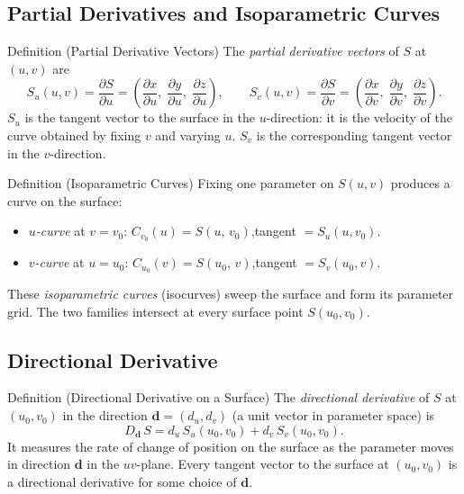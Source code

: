 \subsection*{Partial Derivatives and Isoparametric Curves}

\begin{propositionbox}{Definition (Partial Derivative Vectors)}
The \emph{partial derivative vectors} of $S$ at $(u,v)$ are
\[
  S_u(u,v) = \frac{\partial S}{\partial u}
  = \left(\frac{\partial x}{\partial u},\;
          \frac{\partial y}{\partial u},\;
          \frac{\partial z}{\partial u}\right),
  \qquad
  S_v(u,v) = \frac{\partial S}{\partial v}
  = \left(\frac{\partial x}{\partial v},\;
          \frac{\partial y}{\partial v},\;
          \frac{\partial z}{\partial v}\right).
\]
$S_u$ is the tangent vector to the surface in the $u$-direction:
it is the velocity of the curve obtained by fixing $v$ and varying $u$.
$S_v$ is the corresponding tangent vector in the $v$-direction.
\end{propositionbox}

\begin{propositionbox}{Definition (Isoparametric Curves)}
Fixing one parameter on $S(u,v)$ produces a curve on the surface:
\begin{itemize}
  \item \emph{$u$-curve} at $v = v_0$:\quad
        $C_{v_0}(u) = S(u,\,v_0)$,\quad tangent $= S_u(u,v_0)$.
  \item \emph{$v$-curve} at $u = u_0$:\quad
        $C_{u_0}(v) = S(u_0,\,v)$,\quad tangent $= S_v(u_0,v)$.
\end{itemize}
These \emph{isoparametric curves} (isocurves) sweep the surface and
form its parameter grid.
The two families intersect at every surface point $S(u_0,v_0)$.
\end{propositionbox}

\subsection*{Directional Derivative}

\begin{propositionbox}{Definition (Directional Derivative on a Surface)}
The \emph{directional derivative} of $S$ at $(u_0,v_0)$ in the
direction $\mathbf{d} = (d_u, d_v)$ (a unit vector in parameter space) is
\[
  D_{\mathbf{d}}\,S = d_u\,S_u(u_0,v_0) + d_v\,S_v(u_0,v_0).
\]
It measures the rate of change of position on the surface as the
parameter moves in direction $\mathbf{d}$ in the $uv$-plane.
Every tangent vector to the surface at $(u_0,v_0)$ is a directional
derivative for some choice of $\mathbf{d}$.
\end{propositionbox}

